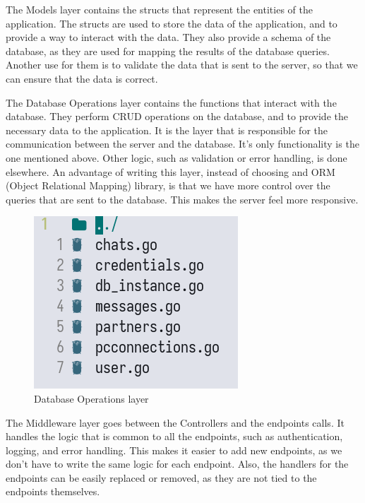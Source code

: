 \par
The Models layer contains the structs that represent the entities of the application. 
The structs are used to store the data of the application, and to provide a way to interact with the data.
They also provide a schema of the database, as they are used for mapping the results of the database queries.
Another use for them is to validate the data that is sent to the server, so that we can ensure that the data is correct.

\par
The Database Operations layer contains the functions that interact with the database.
They perform CRUD operations on the database, and to provide the necessary data to the application.
It is the layer that is responsible for the communication between the server and the database.
It's only functionality is the one mentioned above. Other logic, such as validation or error handling, is done elsewhere.
An advantage of writing this layer, instead of choosing and ORM (Object Relational Mapping) library, is that we have more control over the queries that are sent to the database.
This makes the server feel more responsive.

\begin{figure}[htbp]
    \centering
    \includegraphics[scale=0.8]{pictures/dboperations.png}
    \caption{Database Operations layer}
    \label{dbOpsExample}
\end{figure}

\par
The Middleware layer goes between the Controllers and the endpoints calls.
It handles the logic that is common to all the endpoints, such as authentication, logging, and error handling.
This makes it easier to add new endpoints, as we don't have to write the same logic for each endpoint.
Also, the handlers for the endpoints can be easily replaced or removed, as they are not tied to the endpoints themselves.

